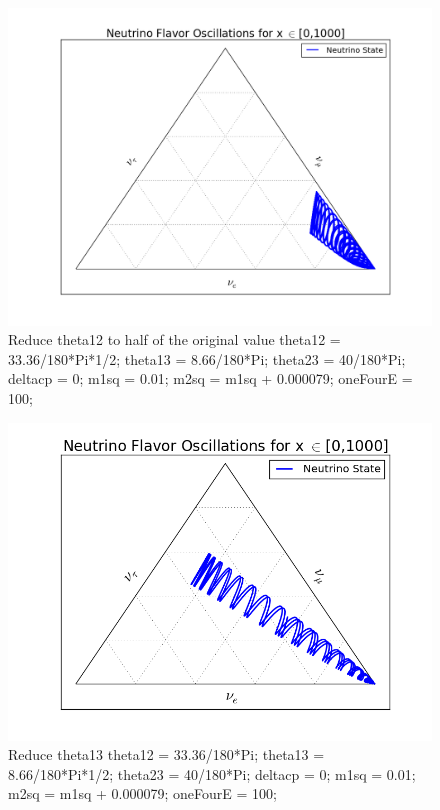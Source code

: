 \documentclass{tufte-handout}
\begin{document}
\begin{figure}
\centering
\includegraphics{assets/ternary/1000-2}
\caption{ Reduce theta12 to half of the original value \newline
theta12 = 33.36/180*Pi*1/2;\newline
theta13 = 8.66/180*Pi;\newline
theta23 = 40/180*Pi;\newline
deltacp = 0;\newline
m1sq = 0.01;\newline
m2sq = m1sq + 0.000079;\newline
oneFourE = 100; 
}
\end{figure}


\begin{figure}
\centering
\includegraphics{assets/ternary/1000-3}
\caption{ Reduce theta13\newline
theta12 = 33.36/180*Pi;\newline
theta13 = 8.66/180*Pi*1/2;\newline
theta23 = 40/180*Pi;\newline
deltacp = 0;\newline
m1sq = 0.01;\newline
m2sq = m1sq + 0.000079;\newline
oneFourE = 100; 
}
\end{figure}
\end{document}
